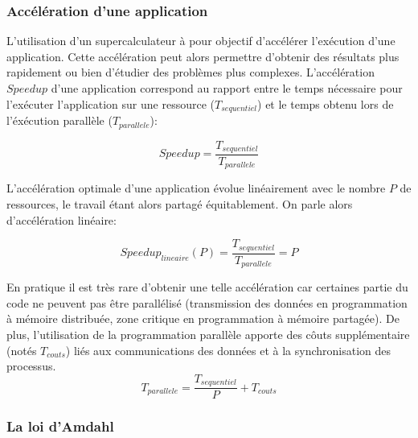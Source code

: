    \subsubsection{Accélération d'une application}
    
        L'utilisation d'un supercalculateur à pour objectif d'accélérer l'exécution d'une application. Cette accélération peut alors permettre d'obtenir des résultats plus rapidement ou bien d'étudier des problèmes plus complexes. L'accélération $Speedup$ d'une application correspond au rapport entre le temps nécessaire pour l'exécuter l'application sur une ressource ($T_{sequentiel}$) et le temps obtenu lors de l'éxécution parallèle ($T_{parallele}$):
        
        \begin{equation}
        \label{eq_speedup}
        Speedup = \frac{T_{sequentiel}}{T_{parallele}}
        \end{equation}
        
        L'accélération optimale d'une application évolue linéairement avec le nombre $P$ de ressources, le travail étant alors partagé équitablement. On parle alors d'accélération linéaire:
        
        \begin{equation}
        Speedup_{lineaire} (P) = \frac{T_{sequentiel}}{T_{parallele}} = P
        \end{equation}
            
        En pratique il est très rare d'obtenir une telle accélération car certaines partie du code ne peuvent pas être parallélisé (transmission des données en programmation à mémoire distribuée, zone critique en programmation à mémoire partagée). De plus, l'utilisation de la programmation parallèle apporte des côuts supplémentaire (notés $T_{couts}$) liés aux communications des données et à la synchronisation des processus.
        \begin{equation}
        T_{parallele} = \frac{T_{sequentiel}}{P} + T_{couts}
        \end{equation}
  
    
  
    \subsubsection{La loi d'Amdahl} 
        
